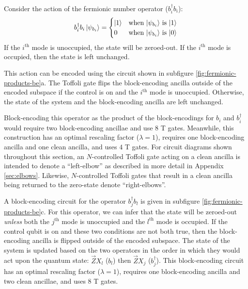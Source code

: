 Consider the action of the fermionic number operator ($b_i^\dagger b_i$):
\begin{equation}
    \begin{split}
        b_i^\dagger b_i \ket{\psi_{b_i}} = \begin{cases} 
            \ket{1} & \text{when $\ket{\psi_{b_i}}$ is $\ket{1}$} \\
            0 & \text{when $\ket{\psi_{b_i}}$ is $\ket{0}$} \\
                                        \end{cases}
    \end{split}
\end{equation}
If the $i^\text{th}$ mode is unoccupied, the state will be zeroed-out.
If the $i^\text{th}$ mode is occupied, then the state is left unchanged.

This action can be encoded using the circuit shown in subfigure \ref{fig:fermionic-products-be}a.
The Toffoli gate flips the block-encoding ancilla outside of the encoded subspace if the control is on and the $i^\text{th}$ mode is unoccupied.
Otherwise, the state of the system and the block-encoding ancilla are left unchanged.

Block-encoding this operator as the product of the block-encodings for $b_i$ and $b_i^\dagger$ would require two block-encoding ancillae and use $8$ T gates.
Meanwhile, this construction has an optimal rescaling factor ($\lambda = 1$), requires one block-encoding ancilla and one clean ancilla, and uses $4$ T gates.
For circuit diagrams shown throughout this section, an $N$-controlled Toffoli gate acting on a clean ancilla is intended to denote a ``left-elbow'' as described in more detail in Appendix \ref{sec:elbows}.
Likewise, $N$-controlled Toffoli gates that result in a clean ancilla being returned to the zero-state denote ``right-elbows''.

A block-encoding circuit for the operator $b_j^\dagger b_l$ is given in subfigure \ref{fig:fermionic-products-be}c.
For this operator, we can infer that the state will be zeroed-out \textit{unless} both the $j^\text{th}$ mode is unoccupied and the $l^\text{th}$ mode is occupied.
If the control qubit is on and these two conditions are not both true, then the block-encoding ancilla is flipped outside of the encoded subspace.
The state of the system is updated based on the two operators in the order in which they would act upon the quantum state: $\vec{Z}X_l$ ($b_l$) then $\vec{Z}X_j$ ($b_j^\dagger$).
This block-encoding circuit has an optimal rescaling factor ($\lambda = 1$), requires one block-encoding ancilla and two clean ancillae, and uses $8$ T gates.


